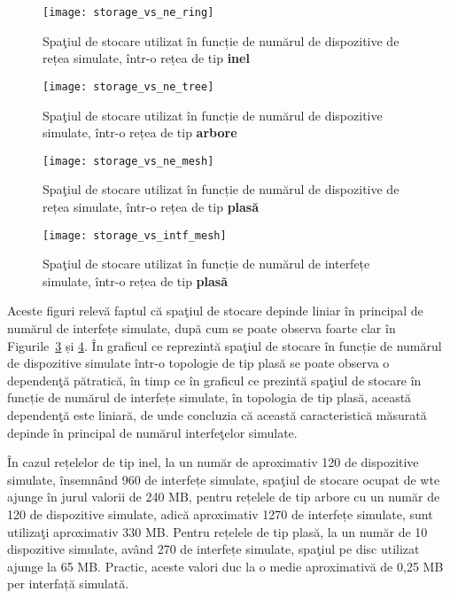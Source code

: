 \begin{figure}[hp]
	\centering
	\texttt{[image: storage\_vs\_ne\_ring]}
	\caption{Spaţiul de stocare utilizat în funcție de numărul de dispozitive de rețea simulate, într-o rețea de tip \textbf{inel}}
	\label{fig:storage_vs_ne_ring}
\end{figure}

\begin{figure}[hp]
	\centering
	\texttt{[image: storage\_vs\_ne\_tree]}
	\caption{Spaţiul de stocare utilizat în funcție de numărul de dispozitive simulate, într-o rețea de tip \textbf{arbore}}
	\label{fig:storage_vs_ne_tree}
\end{figure}

\begin{figure}[hp]
	\centering
	\texttt{[image: storage\_vs\_ne\_mesh]}
	\caption{Spaţiul de stocare utilizat în funcție de numărul de dispozitive de rețea simulate, într-o rețea de tip \textbf{plasă}}
	\label{fig:storage_vs_ne_mesh}
\end{figure}

\begin{figure}[hp]
	\centering
	\texttt{[image: storage\_vs\_intf\_mesh]}
	\caption{Spaţiul de stocare utilizat în funcție de numărul de interfețe simulate, într-o rețea de tip \textbf{plasă}}
	\label{fig:storage_vs_intf_mesh}
\end{figure}

Aceste figuri relevă faptul că spaţiul de stocare depinde liniar în principal de numărul de interfețe simulate, după cum se poate observa foarte clar în Figurile~\ref{fig:storage_vs_ne_mesh} și \ref{fig:storage_vs_intf_mesh}. În graficul ce reprezintă spaţiul de stocare în funcție de numărul de dispozitive simulate într-o topologie de tip plasă se poate observa o dependenţă pătratică, în timp ce în graficul ce prezintă spaţiul de stocare în funcție de numărul de interfețe simulate, în topologia de tip plasă, această dependenţă este liniară, de unde concluzia că această caracteristică măsurată depinde în principal de numărul interfeţelor simulate.

În cazul rețelelor de tip inel, la un număr de aproximativ 120 de dispozitive simulate, însemnând 960 de interfețe simulate, spaţiul de stocare ocupat de \gls{wte} ajunge în jurul valorii de 240 MB, pentru rețelele de tip arbore cu un număr de 120 de dispozitive simulate, adică aproximativ 1270 de interfețe simulate, sunt utilizaţi aproximativ 330 MB. Pentru rețelele de tip plasă, la un număr de 10 dispozitive simulate, având 270 de interfețe simulate, spaţiul pe disc utilizat ajunge la 65 MB. Practic, aceste valori duc la o medie aproximativă de 0,25 MB per interfață simulată.

